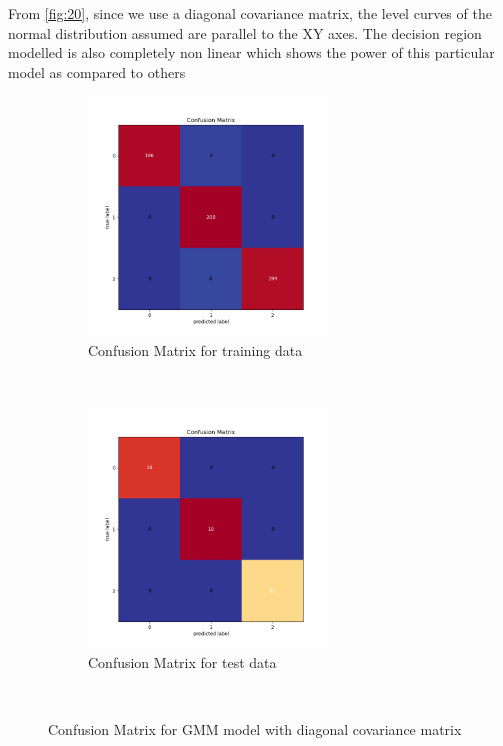 From \ref{fig:20}, since we use a diagonal covariance matrix, the level curves of the normal distribution assumed are parallel to the XY axes. The decision region modelled is also completely non linear which shows the power of this particular model as compared to others

\begin{figure}[!ht]
    \centering
    \begin{subfigure}[t]{0.5\textwidth}
        \centering
        \includegraphics[height=2.5in]{Dataset_1b/GMM_7_cmatrix_train_data_diag.png}
        \caption{Confusion Matrix for training data}
    \end{subfigure}%
    ~ 
    \begin{subfigure}[t]{0.5\textwidth}
        \centering
        \includegraphics[height=2.5in]{Dataset_1b/GMM_7_cmatrix_test_data_diag.png}
        \caption{Confusion Matrix for test data}
    \end{subfigure}%
    ~
    \caption{Confusion Matrix for GMM model with diagonal covariance matrix}
    \label{fig:19}
\end{figure}

